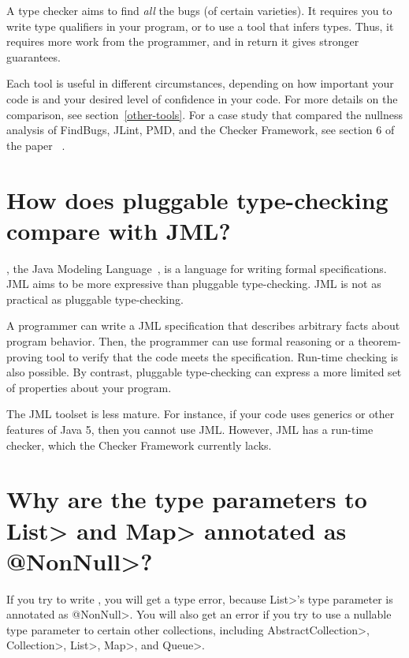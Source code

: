 A type checker aims to find \emph{all} the bugs (of certain varieties).
It requires you to write type qualifiers in your program, or to use a tool
that infers types.  Thus, it requires more work from the programmer, and in
return it gives stronger guarantees.

Each tool is useful in different circumstances, depending on how important
your code is and your desired level of confidence in your code.  For more
details on the comparison, see section~\ref{other-tools}.  For a case study
that compared the nullness analysis of FindBugs, JLint, PMD, and the
Checker Framework, see section 6 of the paper
~\cite{PapiACPE2008}.


\section{How does pluggable type-checking compare with JML?\label{faq-jml}}

, the Java Modeling
Language~\cite{LeavensBR2006:JML}, is a language for writing formal
specifications.  JML aims to be more expressive than pluggable
type-checking.  JML is not as practical as pluggable type-checking.

A programmer can write a JML specification that
describes arbitrary facts about program behavior.  Then, the programmer can
use formal reasoning or a theorem-proving tool to verify that the code
meets the specification.  Run-time checking is also possible.
By contrast, pluggable type-checking can express a more limited set of
properties about your program.

The JML toolset is less mature.  For instance, if your code uses
generics or other features of Java 5, then you cannot use JML.  
However, JML has a run-time checker, which the Checker Framework currently
lacks.


\section{Why are the type parameters to \<List> and \<Map> annotated as \<@NonNull>?\label{faq-list-map-nonnull-typeargs}}

If you try to write , you will get a type
error, because \<List>'s type parameter is annotated as \<@NonNull>.
You will also get an error if you try to use a nullable
type parameter to certain other collections, including
\<AbstractCollection>, \<Collection>, \<List>, \<Map>, and \<Queue>.

